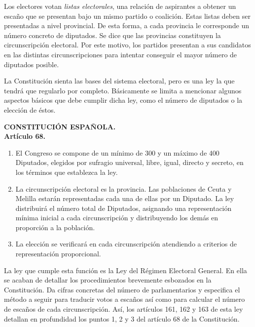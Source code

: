 \documentclass[11pt]{article}
\newcommand\console[1]{{\inconsolata #1}}
\begin{document}
	Los electores votan \textit{listas electorales}, una relación de aspirantes a obtener un escaño que se presentan bajo un mismo partido o coalición. Estas listas deben ser presentadas a nivel provincial. De esta forma, a cada provincia le corresponde un número concreto de diputados. Se dice que las provincias constituyen la circunscripción electoral. Por este motivo, los partidos presentan a sus candidatos en las distintas circunscripciones para intentar conseguir el mayor número de diputados posible.
	
	La Constitución sienta las bases del sistema electoral, pero es una ley la que tendrá que regularlo por completo. Básicamente se limita a mencionar algunos aspectos básicos que debe cumplir dicha ley, como el número de diputados o la elección de éstos. \\
	
	\console{
		\begin{leftbar}
			\textbf{CONSTITUCIÓN ESPAÑOLA.} \\
			\textbf{Artículo 68.}
			
			\begin{enumerate}
			\item El Congreso se compone de un mínimo de 300 y un máximo de 400 Diputados, elegidos por sufragio universal, libre, igual, directo y secreto, en los términos que establezca la ley.
			\item La circunscripción electoral es la provincia. Las poblaciones de Ceuta y Melilla estarán representadas cada una de ellas por un Diputado. La ley distribuirá el número total de Diputados, asignando una representación mínima inicial a cada circunscripción y distribuyendo los demás en proporción a la población.
			\item La elección se verificará en cada circunscripción atendiendo a criterios de representación proporcional. \\
		\end{enumerate}	
		\end{leftbar}
	}
	
	La ley que cumple esta función es la Ley del Régimen Electoral General. En ella se acaban de detallar los procedimientos brevemente esbozados en la Constitución. Da cifras concretas del número de parlamentarios y especifica el método a seguir para traducir votos a escaños así como para calcular el número de escaños de cada circunscripción. Así, los artículos 161, 162 y 163 de esta ley detallan en profundidad los puntos 1, 2 y 3 del artículo 68 de la Constitución. \\
	
\end{document}
